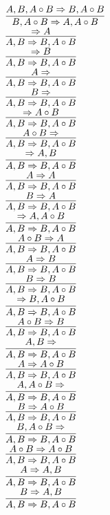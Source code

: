 \documentclass[11pt]{article}
\begin{document}
\begin{center}
\bigskip
\\$\infer{B, A\circ B\Rightarrow A, A\circ B}{A, B, A\circ B\Rightarrow B, A\circ B}$
\bigskip
\\$\infer{A, B\Rightarrow B, A\circ B}{\Rightarrow A}$
\bigskip
\\$\infer{A, B\Rightarrow B, A\circ B}{\Rightarrow B}$
\bigskip
\\$\infer{A, B\Rightarrow B, A\circ B}{A\Rightarrow }$
\bigskip
\\$\infer{A, B\Rightarrow B, A\circ B}{B\Rightarrow }$
\bigskip
\\$\infer{A, B\Rightarrow B, A\circ B}{\Rightarrow A\circ B}$
\bigskip
\\$\infer{A, B\Rightarrow B, A\circ B}{A\circ B\Rightarrow }$
\bigskip
\\$\infer{A, B\Rightarrow B, A\circ B}{\Rightarrow A, B}$
\bigskip
\\$\infer{A, B\Rightarrow B, A\circ B}{A\Rightarrow A}$
\bigskip
\\$\infer{A, B\Rightarrow B, A\circ B}{B\Rightarrow A}$
\bigskip
\\$\infer{A, B\Rightarrow B, A\circ B}{\Rightarrow A, A\circ B}$
\bigskip
\\$\infer{A, B\Rightarrow B, A\circ B}{A\circ B\Rightarrow A}$
\bigskip
\\$\infer{A, B\Rightarrow B, A\circ B}{A\Rightarrow B}$
\bigskip
\\$\infer{A, B\Rightarrow B, A\circ B}{B\Rightarrow B}$
\bigskip
\\$\infer{A, B\Rightarrow B, A\circ B}{\Rightarrow B, A\circ B}$
\bigskip
\\$\infer{A, B\Rightarrow B, A\circ B}{A\circ B\Rightarrow B}$
\bigskip
\\$\infer{A, B\Rightarrow B, A\circ B}{A, B\Rightarrow }$
\bigskip
\\$\infer{A, B\Rightarrow B, A\circ B}{A\Rightarrow A\circ B}$
\bigskip
\\$\infer{A, B\Rightarrow B, A\circ B}{A, A\circ B\Rightarrow }$
\bigskip
\\$\infer{A, B\Rightarrow B, A\circ B}{B\Rightarrow A\circ B}$
\bigskip
\\$\infer{A, B\Rightarrow B, A\circ B}{B, A\circ B\Rightarrow }$
\bigskip
\\$\infer{A, B\Rightarrow B, A\circ B}{A\circ B\Rightarrow A\circ B}$
\bigskip
\\$\infer{A, B\Rightarrow B, A\circ B}{A\Rightarrow A, B}$
\bigskip
\\$\infer{A, B\Rightarrow B, A\circ B}{B\Rightarrow A, B}$

\end{center}
\end{document}
